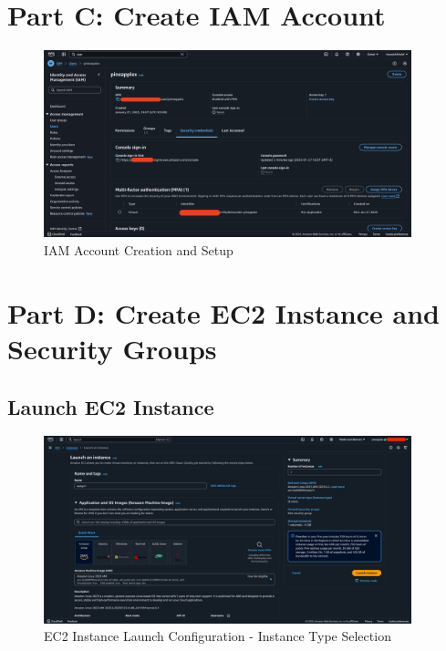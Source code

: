 \documentclass[a4paper,12pt]{article}
\begin{document}
\newpage

\section{Part C: Create IAM Account}

\begin{figure}[H]
    \centering
    \includegraphics[width=0.95\textwidth]{iam-account.png}
    \caption{IAM Account Creation and Setup}
    \label{fig:iam-account}
\end{figure}

\newpage

\section{Part D: Create EC2 Instance and Security Groups}

\subsection{Launch EC2 Instance}

\begin{figure}[H]
    \centering
    \includegraphics[width=0.95\textwidth]{launch-instance-1.png}
    \caption{EC2 Instance Launch Configuration - Instance Type Selection}
    \label{fig:ec2-launch1}
\end{figure}
\end{document}
